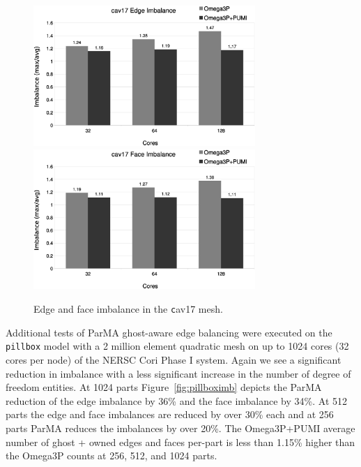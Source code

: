 \documentclass[review,12pt]{elsarticle_summary_report}
\begin{document}
\begin{figure}[!ph]
\centering
  \includegraphics[width=0.75\textwidth]{cav17-edge-imb.eps} \\
  \includegraphics[width=0.75\textwidth]{cav17-face-imb.eps} 
  \caption{\label{fig:cav17imb} Edge and face imbalance in the {\texttt cav17} mesh.}
\end{figure}

Additional tests of ParMA ghost-aware edge balancing were executed on the
\texttt{pillbox} model with a 2 million element quadratic mesh on up to 1024
cores (32 cores per node) of the NERSC Cori Phase I system.
Again we see a significant reduction in imbalance with a less significant increase in the number of degree of freedom entities.
At 1024 parts Figure~\ref{fig:pillboximb} depicts the ParMA reduction of the
edge imbalance by 36\% and the face imbalance by 34\%.
At 512 parts the edge and face imbalances are reduced by over 30\% each and
at 256 parts ParMA reduces the imbalances by over 20\%.
The Omega3P+PUMI average number of ghost + owned edges and faces per-part
is less than 1.15\% higher than the Omega3P counts at 256, 512, and 1024 parts.
\end{document}
